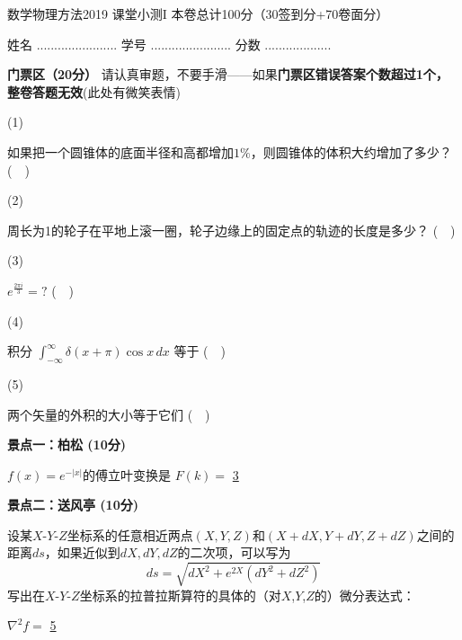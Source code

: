 \documentclass[10pt,CJK]{article}
\begin{document}
\bch
{\large 数学物理方法2019 课堂小测I 本卷总计100分（30签到分+70卷面分）}

{\vskip 0.06in}

姓名 ....................... {\hskip 0.5in}    学号 .......................{\hskip 0.5in}  分数 ...................

{\vskip 0.1in}

{\bf 门票区（20分）} 请认真审题，不要手滑——如果{\bf 门票区错误答案个数超过1个，整卷答题无效}(此处有微笑表情)

{\vskip 0.02in}

  \bitem
\item[(1)]{如果把一个圆锥体的底面半径和高都增加$1\%$，则圆锥体的体积大约增加了多少？   \hfill (\ \ )
  
   }
\item[(2)]{周长为1的轮子在平地上滚一圈，轮子边缘上的固定点的轨迹的长度是多少？ \hfill  (\ \ )


 }
\item[(3)]{$e^{\frac{2\pi i}{3}}=?$ \hfill  (\ \ )


 }
\item[(4)]{积分 $\int_{-\infty}^\infty  \delta(x+\pi) \cos x\, dx$ 等于 \hfill (\ \ )

 }
\item[(5)]{两个矢量的外积的大小等于它们 \hfill (\ \ )

 }
  \eitem
  
  {\vskip 0.03in}

{\bf 景点一：柏松 (10分)}

{\vskip 0.03in}

$f(x)=e^{-|x|}$的傅立叶变换是 $F(k)=$ \uline{3}  

{\vskip 0.06in}

{\bf 景点二：送风亭 (10分)}

{\vskip 0.03in}

设某$X$-$Y$-$Z$坐标系的任意相近两点$(X,Y,Z)$和$(X+dX, Y+dY, Z+dZ)$之间的距离$ds$，如果近似到$dX,dY,dZ$的二次项，可以写为
$$ ds = \sqrt{dX^2+e^{2X}(dY^2+dZ^2)}$$
写出在$X$-$Y$-$Z$坐标系的拉普拉斯算符的具体的（对$X$,$Y$,$Z$的）微分表达式：

{\vskip 0.15in}

$\nabla^2f = $ \uline{5}
\end{document}
